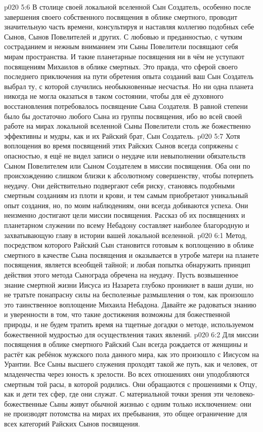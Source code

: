 \vs p020 5:6 В столице своей локальной вселенной Сын Создатель, особенно после завершения своего собственного посвящения в облике смертного, проводит значительную часть времени, консультируя и наставляя коллегию подобных себе Сынов, Сынов Повелителей и других. С любовью и преданностью, с чутким состраданием и нежным вниманием эти Сыны Повелители посвящают себя мирам пространства. И такие планетарные посвящения ни в чём не уступают посвящениям Михаилов в облике смертных. Это правда, что сферой своего последнего приключения на пути обретения опыта созданий ваш Сын Создатель выбрал ту, с которой случились необыкновенные несчастья. Но ни одна планета никогда не могла оказаться в таком состоянии, чтобы для её духовного восстановления потребовалось посвящение Сына Создателя. В равной степени было бы достаточно любого Сына из группы посвящения, ибо во всей своей работе на мирах локальной вселенной Сыны Повелители столь же божественно эффективны и мудры, как и их Райский брат, Сын Создатель.
\vs p020 5:7 \pc Хотя воплощения во время посвящений этих Райских Сынов всегда сопряжены с опасностью, я ещё не видел записи о неудаче или невыполнении обязательств Сыном Повелителем или Сыном Создателем в миссии посвящения. Оба они по происхождению слишком близки к абсолютному совершенству, чтобы потерпеть неудачу. Они действительно подвергают себя риску, становясь подобными смертным созданиям из плоти и крови, и тем самым приобретают уникальный опыт создания, но, по моим наблюдениям, они всегда добиваются успеха. Они неизменно достигают цели миссии посвящения. Рассказ об их посвящениях и планетарном служении по всему Небадону составляет наиболее благородную и захватывающую главу в истории вашей локальной вселенной.
\vs p020 6:1 Метод, посредством которого Райский Сын становится готовым к воплощению в облике смертного в качестве Сына посвящения и оказывается в утробе матери на планете посвящения, является всеобщей тайной; и любая попытка обнаружить принцип действия этого метода Сынограда обречена на неудачу. Пусть возвышенное знание смертной жизни Иисуса из Назарета глубоко проникнет в ваши души, но не тратьте понапрасну силы на бесполезные размышления о том, как произошло это таинственное воплощение Михаила Небадона. Давайте же радоваться знанию и уверенности в том, что такие достижения возможны для божественной природы, и не будем тратить время на тщетные догадки о методе, используемом божественной мудростью для осуществления таких явлений.
\vs p020 6:2 \pc Для миссии посвящения в облике смертного Райский Сын всегда рождается от женщины и растёт как ребёнок мужского пола данного мира, как это произошло с Иисусом на Урантии. Все Сыны высшего служения проходят такой же путь, как и человек, от младенчества через юность к зрелости. Во всех отношениях они уподобляются смертным той расы, в которой родились. Они обращаются с прошениями к Отцу, как и дети тех сфер, где они служат. С материальной точки зрения эти человеко\hyp{}божественные Сыны живут обычной жизнью с одним только исключением: они не производят потомства на мирах их пребывания, это общее ограничение для всех категорий Райских Сынов посвящения.
